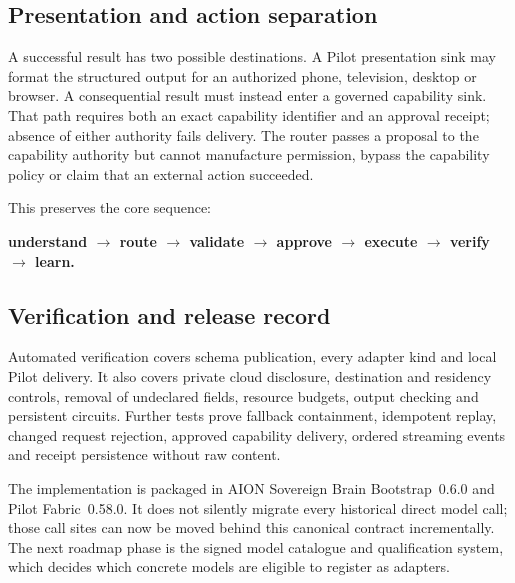 \subsection{Presentation and action separation}

A successful result has two possible destinations.  A Pilot presentation sink may
format the structured output for an authorized phone, television, desktop or browser.
A consequential result must instead enter a governed capability sink.  That path
requires both an exact capability identifier and an approval receipt; absence of
either authority fails delivery.  The router passes a proposal to the capability
authority but cannot manufacture permission, bypass the capability policy or claim
that an external action succeeded.

This preserves the core sequence:

\begin{center}
\textbf{understand $\rightarrow$ route $\rightarrow$ validate $\rightarrow$ approve
$\rightarrow$ execute $\rightarrow$ verify $\rightarrow$ learn.}
\end{center}

\subsection{Verification and release record}

Automated verification covers schema publication, every adapter kind and local Pilot
delivery.  It also covers private cloud disclosure, destination and residency controls,
removal of undeclared fields, resource budgets, output checking and persistent circuits.
Further tests prove fallback containment, idempotent replay, changed request rejection,
approved capability delivery, ordered streaming events and receipt persistence without
raw content.

The implementation is packaged in AION Sovereign Brain Bootstrap~0.6.0 and Pilot
Fabric~0.58.0.  It does not silently migrate every historical direct model call; those
call sites can now be moved behind this canonical contract incrementally.  The next
roadmap phase is the signed model catalogue and qualification system, which decides
which concrete models are eligible to register as adapters.
